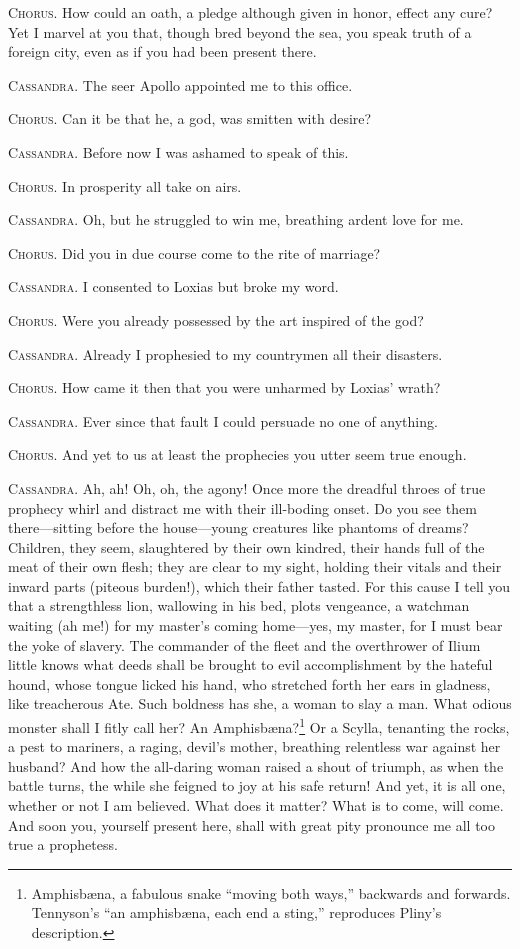 \documentclass[12pt]{article}
\begin{document}
\textsc{Chorus.} How could an oath, a pledge although given in honor, effect any cure? Yet I marvel at you that, though bred beyond the sea, you speak truth of a foreign city, even as if you had been present there.

\textsc{Cassandra.} The seer Apollo appointed me to this office.

\textsc{Chorus.} Can it be that he, a god, was smitten with desire?

\textsc{Cassandra.} Before now I was ashamed to speak of this.

\textsc{Chorus.} In prosperity all take on airs.

\textsc{Cassandra.} Oh, but he struggled to win me, breathing ardent love for me.

\textsc{Chorus.} Did you in due course come to the rite of marriage?

\textsc{Cassandra.} I consented to Loxias but broke my word.

\textsc{Chorus.} Were you already possessed by the art inspired of the god?

\textsc{Cassandra.} Already I prophesied to my countrymen all their disasters.

\textsc{Chorus.} How came it then that you were unharmed by Loxias' wrath?

\textsc{Cassandra.} Ever since that fault I could persuade no one of anything.

\textsc{Chorus.} And yet to us at least the prophecies you utter seem true enough.

\textsc{Cassandra.} Ah, ah! Oh, oh, the agony! Once more the dreadful throes of true prophecy whirl and distract me with their ill-boding onset. Do you see them there---sitting before the house---young creatures like phantoms of dreams? Children, they seem, slaughtered by their own kindred, their hands full of the meat of their own flesh; they are clear to my sight, holding their vitals and their inward parts (piteous burden!), which their father tasted. For this cause I tell you that a strengthless lion, wallowing in his bed, plots vengeance, a watchman waiting (ah me!) for my master's coming home---yes, my master, for I must bear the yoke of slavery. The commander of the fleet and the overthrower of Ilium little knows what deeds shall be brought to evil accomplishment by the hateful hound, whose tongue licked his hand, who stretched forth her ears in gladness, like treacherous Ate. Such boldness has she, a woman to slay a man. What odious monster shall I fitly call her? An Amphisb{\ae}na?\footnote{Amphisb{\ae}na, a fabulous snake ``moving both ways,'' backwards and forwards. Tennyson's ``an amphisb{\ae}na, each end a sting,'' reproduces Pliny's description.} Or a Scylla, tenanting the rocks, a pest to mariners, a raging, devil's mother, breathing relentless war against her husband? And how the all-daring woman raised a shout of triumph, as when the battle turns, the while she feigned to joy at his safe return! And yet, it is all one, whether or not I am believed. What does it matter? What is to come, will come. And soon you, yourself present here, shall with great pity pronounce me all too true a prophetess.
\end{document}

